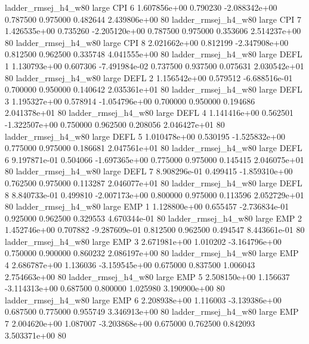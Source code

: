 ladder_rmsej_h4_w80      large      CPI                 6 1.607856e+00      0.790230 -2.088342e+00 0.787500 0.975000       0.482644 2.439806e+00 80
ladder_rmsej_h4_w80      large      CPI                 7 1.426535e+00      0.735260 -2.205120e+00 0.787500 0.975000       0.353606 2.514237e+00 80
ladder_rmsej_h4_w80      large      CPI                 8 2.021662e+00      0.812199 -2.347908e+00 0.812500 0.962500       0.335748 4.041555e+00 80
ladder_rmsej_h4_w80      large     DEFL                 1 1.130793e+00      0.607306 -7.491984e-02 0.737500 0.937500       0.075631 2.030542e+01 80
ladder_rmsej_h4_w80      large     DEFL                 2 1.156542e+00      0.579512 -6.688516e-01 0.700000 0.950000       0.140642 2.035361e+01 80
ladder_rmsej_h4_w80      large     DEFL                 3 1.195327e+00      0.578914 -1.054796e+00 0.700000 0.950000       0.194686 2.041378e+01 80
ladder_rmsej_h4_w80      large     DEFL                 4 1.141416e+00      0.562501 -1.322507e+00 0.750000 0.962500       0.208056 2.046427e+01 80
ladder_rmsej_h4_w80      large     DEFL                 5 1.010478e+00      0.530195 -1.525832e+00 0.775000 0.975000       0.186681 2.047561e+01 80
ladder_rmsej_h4_w80      large     DEFL                 6 9.197871e-01      0.504066 -1.697365e+00 0.775000 0.975000       0.145415 2.046075e+01 80
ladder_rmsej_h4_w80      large     DEFL                 7 8.908296e-01      0.499415 -1.859310e+00 0.762500 0.975000       0.113287 2.046077e+01 80
ladder_rmsej_h4_w80      large     DEFL                 8 8.840733e-01      0.499810 -2.007173e+00 0.800000 0.975000       0.113596 2.052729e+01 80
ladder_rmsej_h4_w80      large      EMP                 1 1.128800e+00      0.655457 -2.736834e-01 0.925000 0.962500       0.329553 4.670344e-01 80
ladder_rmsej_h4_w80      large      EMP                 2 1.452746e+00      0.707882 -9.287609e-01 0.812500 0.962500       0.494547 8.443661e-01 80
ladder_rmsej_h4_w80      large      EMP                 3 2.671981e+00      1.010202 -3.164796e+00 0.750000 0.900000       0.860232 2.086197e+00 80
ladder_rmsej_h4_w80      large      EMP                 4 2.686787e+00      1.136036 -3.159545e+00 0.675000 0.837500       1.006043 2.754663e+00 80
ladder_rmsej_h4_w80      large      EMP                 5 2.508150e+00      1.156637 -3.114313e+00 0.687500 0.800000       1.025980 3.190900e+00 80
ladder_rmsej_h4_w80      large      EMP                 6 2.208938e+00      1.116003 -3.139386e+00 0.687500 0.775000       0.955749 3.346913e+00 80
ladder_rmsej_h4_w80      large      EMP                 7 2.004620e+00      1.087007 -3.203868e+00 0.675000 0.762500       0.842093 3.503371e+00 80
